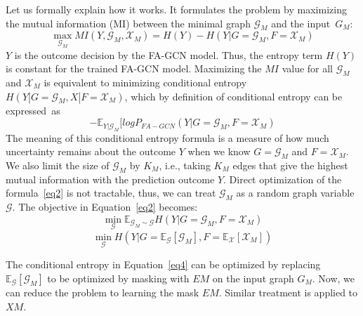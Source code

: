 Let us formally explain how it works. It
formulates the problem by maximizing the mutual information (MI)
between the minimal graph $\mathcal{G}_M$ and the input~$G_M$:
\begin{equation}\label{maineq}
\max_{\mathcal{G}_M} MI(Y,\mathcal{G}_M, \mathcal{X}_M) = H(Y) - H(Y|G=\mathcal{G}_M, F=\mathcal{X}_M)
\end{equation}
$Y$ is the outcome decision by the FA-GCN model. Thus, the entropy term
$H(Y)$ is constant for the trained FA-GCN model. Maximizing the $MI$
value for all $\mathcal{G}_M$ and $\mathcal{X}_M$ is equivalent to minimizing conditional
entropy $H(Y|G=\mathcal{G}_M, X|F=\mathcal{X}_M)$, which by definition of
conditional entropy can be expressed~as
\begin{equation}
  \label{eq2}
-\mathbb{E}_{Y|\mathcal{G}_M}
  [log P_{FA-GCN} (Y|G=\mathcal{G}_M,F=\mathcal{X}_M)
  \end{equation}
The meaning of this conditional entropy formula is a measure of how
much uncertainty remains about the outcome $Y$ when we know
$G=\mathcal{G}_M$ and $F=\mathcal{X}_M$. We also limit the
size of $\mathcal{G}_M$ by $K_M$, i.e., taking $K_M$ edges that give
the highest mutual information with the prediction outcome $Y$.
%
Direct optimization of the formula~\ref{eq2} is not tractable, thus,
we can treat $\mathcal{G}_M$ as a random graph variable
$\mathcal{G}$. The objective in Equation~\ref{eq2} becomes:
\begin{equation}
  \label{eq3}
  \min_{\mathcal{G}} \mathbb{E}_{\mathcal{G}_M \sim \mathcal{G}} H(Y|G=\mathcal{G}_M,F=\mathcal{X}_M)
\end{equation}
\begin{equation}
  \label{eq4}
  \min_{\mathcal{G}} H(Y| G=\mathbb{E}_{\mathcal{G}}[\mathcal{G}_M], F = \mathbb{E}_{\mathcal{X}}[\mathcal{X}_M])
\end{equation}


The conditional entropy in Equation~\ref{eq4} can be
optimized by replacing $\mathbb{E}_{\mathcal{G}}[\mathcal{G}_M]$ to be
optimized by masking with $EM$ on the input graph $G_M$.
Now, we can reduce the problem to learning the mask $EM$.
Similar treatment is applied to $XM$.

